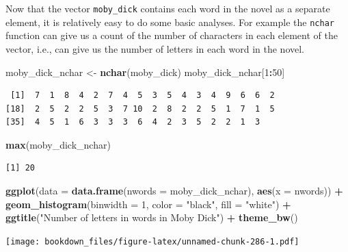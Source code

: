 \documentclass[
]{krantz}
\makeatletter
\newenvironment{Shaded}{\begin{snugshade}}{\end{snugshade}}
\newcommand{\DataTypeTok}[1]{\textcolor[rgb]{0.27,0.27,0.27}{#1}}
\newcommand{\DecValTok}[1]{\textcolor[rgb]{0.06,0.06,0.06}{#1}}
\newcommand{\KeywordTok}[1]{\textcolor[rgb]{0.27,0.27,0.27}{\textbf{#1}}}
\newcommand{\NormalTok}[1]{#1}
\newcommand{\OperatorTok}[1]{\textcolor[rgb]{0.43,0.43,0.43}{\textbf{#1}}}
\newcommand{\StringTok}[1]{\textcolor[rgb]{0.5,0.5,0.5}{#1}}
\newenvironment{kframe}{%
\medskip{}
\setlength{\fboxsep}{.8em}
 \def\at@end@of@kframe{}%
 \ifinner\ifhmode%
  \def\at@end@of@kframe{\end{minipage}}%
  \begin{minipage}{\columnwidth}%
 \fi\fi%
 \def\FrameCommand##1{\hskip\@totalleftmargin \hskip-\fboxsep
 \colorbox{shadecolor}{##1}\hskip-\fboxsep
     \hskip-\linewidth \hskip-\@totalleftmargin \hskip\columnwidth}%
 \MakeFramed {\advance\hsize-\width
   \@totalleftmargin\z@ \linewidth\hsize
   \@setminipage}}%
 {\par\unskip\endMakeFramed%
 \at@end@of@kframe}
\renewenvironment{Shaded}{\begin{kframe}}{\end{kframe}}
\makeatother
\begin{document}
Now that the vector \texttt{moby\_dick} contains each word in the novel as a separate element, it is relatively easy to do some basic analyses. For example the \texttt{nchar} function can give us a count of the number of characters in each element of the vector, i.e., can give us the number of letters in each word in the novel.

\begin{Shaded}
\begin{Highlighting}[]
\NormalTok{moby\_dick\_nchar \textless{}{-}}\StringTok{ }\KeywordTok{nchar}\NormalTok{(moby\_dick)}
\NormalTok{moby\_dick\_nchar[}\DecValTok{1}\OperatorTok{:}\DecValTok{50}\NormalTok{]}
\end{Highlighting}
\end{Shaded}

\begin{verbatim}
 [1]  7  1  8  4  2  7  4  5  3  5  4  3  4  9  6  6  2
[18]  2  5  2  2  5  3  7 10  2  8  2  2  5  1  7  1  5
[35]  4  5  1  6  3  3  3  6  4  2  3  5  2  2  1  3
\end{verbatim}

\begin{Shaded}
\begin{Highlighting}[]
\KeywordTok{max}\NormalTok{(moby\_dick\_nchar)}
\end{Highlighting}
\end{Shaded}

\begin{verbatim}
[1] 20
\end{verbatim}

\begin{Shaded}
\begin{Highlighting}[]
\KeywordTok{ggplot}\NormalTok{(}\DataTypeTok{data =} \KeywordTok{data.frame}\NormalTok{(}\DataTypeTok{nwords =}\NormalTok{ moby\_dick\_nchar), }\KeywordTok{aes}\NormalTok{(}\DataTypeTok{x =}\NormalTok{ nwords)) }\OperatorTok{+}\StringTok{ }
\StringTok{  }\KeywordTok{geom\_histogram}\NormalTok{(}\DataTypeTok{binwidth =} \DecValTok{1}\NormalTok{, }\DataTypeTok{color =} \StringTok{"black"}\NormalTok{, }\DataTypeTok{fill =} \StringTok{"white"}\NormalTok{) }\OperatorTok{+}\StringTok{ }
\StringTok{  }\KeywordTok{ggtitle}\NormalTok{(}\StringTok{"Number of letters in words in Moby Dick"}\NormalTok{) }\OperatorTok{+}\StringTok{ }
\StringTok{  }\KeywordTok{theme\_bw}\NormalTok{()}
\end{Highlighting}
\end{Shaded}

\texttt{[image: bookdown\_files/figure-latex/unnamed-chunk-286-1.pdf]}
\end{document}

